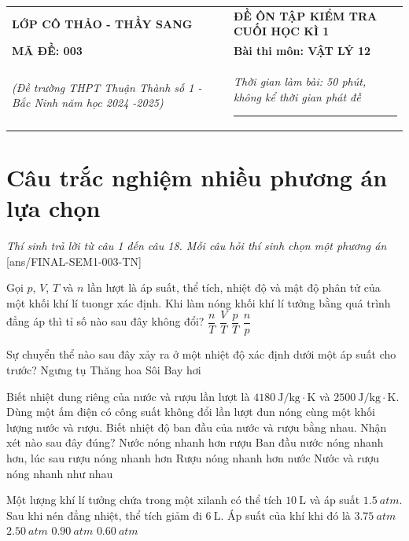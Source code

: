 \begin{tabular}{M{6.5cm}M{11cm}}
	\textbf{LỚP CÔ THẢO - THẦY SANG}& \textbf{ĐỀ ÔN TẬP KIỂM TRA CUỐI HỌC KÌ 1}\\
	\textbf{MÃ ĐỀ: 003}& \textbf{Bài thi môn: VẬT LÝ 12}\\
	\textit{(Đề trường THPT Thuận Thành số 1 - Bắc Ninh năm học 2024 -2025)}& \textit{Thời gian làm bài: 50 phút, không kể thời gian phát đề}
	
	\noindent\rule{4cm}{0.8pt} \\
\end{tabular}
\setcounter{section}{0}
\section{Câu trắc nghiệm nhiều phương án lựa chọn}
\textit{Thí sinh trả lời từ câu 1 đến câu 18. Mỗi câu hỏi thí sinh chọn một phương án}
\setcounter{ex}{0}
[ans/FINAL-SEM1-003-TN]
\begin{ex}
	Gọi $p$, $V$, $T$ và $n$ lần lượt là áp suất, thể tích, nhiệt độ và mật độ phân tử của một khối khí lí tuongr xác định. Khi làm nóng khối khí lí tưởng bằng quá trình đẳng áp thì tỉ số nào sau đây không đổi?
	\choice
	{$\dfrac{n}{T}$}
	{\True $\dfrac{V}{T}$}
	{$\dfrac{p}{T}$}
	{$\dfrac{n}{p}$}
	\loigiai{}
\end{ex}
\begin{ex}
	Sự chuyển thể nào sau đây xảy ra ở một nhiệt độ xác định dưới một áp suất cho trước?
	\choice
	{Ngưng tụ}
	{Thăng hoa}
	{\True Sôi}
	{Bay hơi}
	\loigiai{}
\end{ex}
\begin{ex}
	Biết nhiệt dung riêng của nước và rượu lần lượt là $\SI{4180}{\joule/\kilogram\cdot\kelvin}$ và $\SI{2500}{\joule/\kilogram\cdot\kelvin}$. Dùng một ấm điện có công suất không đổi lần lượt đun nóng cùng một khối lượng nước và rượu. Biết nhiệt độ ban đầu của nước và rượu bằng nhau. Nhận xét nào sau đây đúng?
	\choice
	{Nước nóng nhanh hơn rượu}
	{Ban đầu nước nóng nhanh hơn, lúc sau rượu nóng nhanh hơn}
	{\True Rượu nóng nhanh hơn nước}
	{Nước và rượu nóng nhanh như nhau}
	\loigiai{}
\end{ex}
\begin{ex}
	Một lượng khí lí tưởng chứa trong một xilanh có thể tích $\SI{10}{\liter}$ và áp suất $\SI{1.5}{atm}$. Sau khi nén đẳng nhiệt, thể tích giảm đi $\SI{6}{\liter}$. Áp suất của khí khi đó là
	\choice
	{\True $\SI{3.75}{atm}$}
	{$\SI{2.50}{atm}$}
	{$\SI{0.90}{atm}$}
	{$\SI{0.60}{atm}$}
\end{ex}
